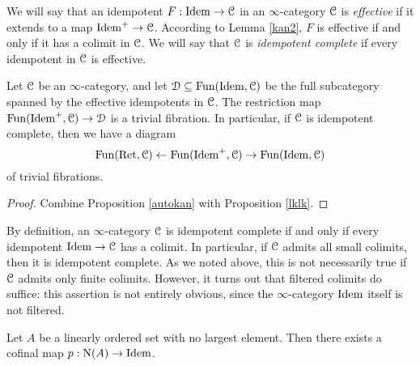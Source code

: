 We will say that an idempotent $F: \operatorname{Idem} \rightarrow \operatorname{\mathcal{C}}$ in an $\infty$-category
$\operatorname{\mathcal{C}}$ is {\it effective} if it extends to a map $\operatorname{Idem}^{+} \rightarrow \operatorname{\mathcal{C}}$. According to Lemma \ref{kan2}, $F$ is effective if and only if it has a colimit in $\operatorname{\mathcal{C}}$. We will say that $\operatorname{\mathcal{C}}$ is {\it idempotent complete} if every idempotent in $\operatorname{\mathcal{C}}$ is effective.

\begin{corollary}
Let $\operatorname{\mathcal{C}}$ be an $\infty$-category, and let $\operatorname{\mathcal{D}} \subseteq \operatorname{Fun}(\operatorname{Idem},\operatorname{\mathcal{C}})$ be the full subcategory spanned by the effective idempotents in $\operatorname{\mathcal{C}}$. The restriction map
$\operatorname{Fun}(\operatorname{Idem}^{+},\operatorname{\mathcal{C}}) \rightarrow \operatorname{\mathcal{D}}$ is a trivial fibration. In particular, if
$\operatorname{\mathcal{C}}$ is idempotent complete, then we have a diagram
$$ \operatorname{Fun}(\operatorname{Ret},\operatorname{\mathcal{C}}) \leftarrow \operatorname{Fun}(\operatorname{Idem}^{+}, \operatorname{\mathcal{C}}) \rightarrow \operatorname{Fun}(\operatorname{Idem},\operatorname{\mathcal{C}})$$
of trivial fibrations.
\end{corollary}

\begin{proof}
Combine Proposition \ref{autokan} with Proposition \ref{lklk}.
\end{proof}

By definition, an $\infty$-category $\operatorname{\mathcal{C}}$ is idempotent complete if and only if every idempotent
$\operatorname{Idem} \rightarrow \operatorname{\mathcal{C}}$ has a colimit. In particular, if $\operatorname{\mathcal{C}}$ admits all small colimits, then it is idempotent complete. As we noted above, this is not necessarily true if $\operatorname{\mathcal{C}}$ admits only finite colimits. However, it turns out that filtered colimits do suffice: this assertion is not entirely obvious, since the $\infty$-category $\operatorname{Idem}$ itself is not filtered.

\begin{proposition}\label{slanger}
Let $A$ be a linearly ordered set with no largest element. Then there exists a cofinal map
$p: \operatorname{N}(A) \rightarrow \operatorname{Idem}$.
\end{proposition}

